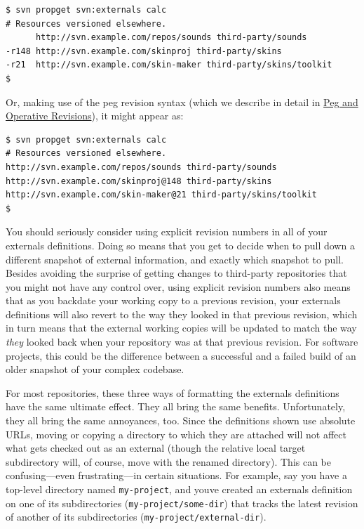\begin{verbatim}
$ svn propget svn:externals calc
# Resources versioned elsewhere.
      http://svn.example.com/repos/sounds third-party/sounds
-r148 http://svn.example.com/skinproj third-party/skins
-r21  http://svn.example.com/skin-maker third-party/skins/toolkit
$
\end{verbatim}

Or, making use of the peg revision syntax (which we describe in detail
in \hyperref[svn.advanced.pegrevs]{Peg and Operative Revisions}), it
might appear as:

\begin{verbatim}
$ svn propget svn:externals calc
# Resources versioned elsewhere.
http://svn.example.com/repos/sounds third-party/sounds
http://svn.example.com/skinproj@148 third-party/skins
http://svn.example.com/skin-maker@21 third-party/skins/toolkit
$
\end{verbatim}

You should seriously consider using explicit revision numbers in all of
your externals definitions. Doing so means that you get to decide when
to pull down a different snapshot of external information, and exactly
which snapshot to pull. Besides avoiding the surprise of getting changes
to third-party repositories that you might not have any control over,
using explicit revision numbers also means that as you backdate your
working copy to a previous revision, your externals definitions will
also revert to the way they looked in that previous revision, which in
turn means that the external working copies will be updated to match the
way \emph{they} looked back when your repository was at that previous
revision. For software projects, this could be the difference between a
successful and a failed build of an older snapshot of your complex
codebase.

For most repositories, these three ways of formatting the externals
definitions have the same ultimate effect. They all bring the same
benefits. Unfortunately, they all bring the same annoyances, too. Since
the definitions shown use absolute URLs, moving or copying a directory
to which they are attached will not affect what gets checked out as an
external (though the relative local target subdirectory will, of course,
move with the renamed directory). This can be confusing---even
frustrating---in certain situations. For example, say you have a
top-level directory named \texttt{my-project}, and
you\textquotesingle ve created an externals definition on one of its
subdirectories (\texttt{my-project/some-dir}) that tracks the latest
revision of another of its subdirectories
(\texttt{my-project/external-dir}).

